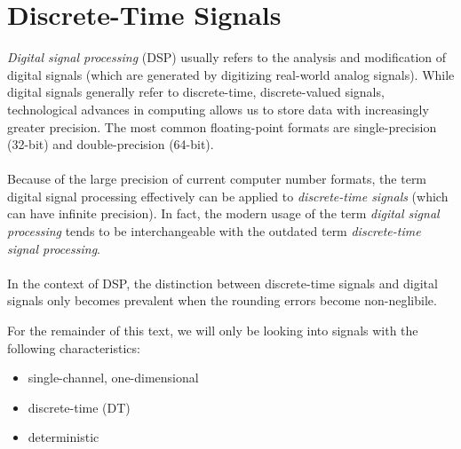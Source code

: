 \documentclass{report}
\begin{document}
 
\chapter{Discrete-Time Signals}
\emph{Digital signal processing} (DSP) usually refers to the analysis and modification of digital signals (which are generated 
by digitizing real-world analog signals). While digital signals generally refer to discrete-time, discrete-valued signals, 
technological advances in computing allows us to store data with increasingly greater precision. The most common floating-point formats 
are single-precision (32-bit) and double-precision (64-bit).
\\ \\ 
Because of the large precision of current computer number formats, the term digital signal processing effectively can be  
applied to \emph{discrete-time signals} (which can have infinite precision). In fact, the modern usage of the term \emph{digital signal processing} tends to be  
interchangeable with the outdated term \emph{discrete-time signal processing}.
\\ \\
In the context of DSP, the distinction between discrete-time signals and digital signals only becomes prevalent when the rounding errors become non-neglibile. 

\begin{tcolorbox}[width=\textwidth,colback={white}, sharp corners]
    For the remainder of this text, we will only be looking into signals with the following characteristics:
    \begin{itemize}
        \item single-channel, one-dimensional
        \item discrete-time (DT)
        \item deterministic
    \end{itemize}
\end{tcolorbox}
\end{document}
